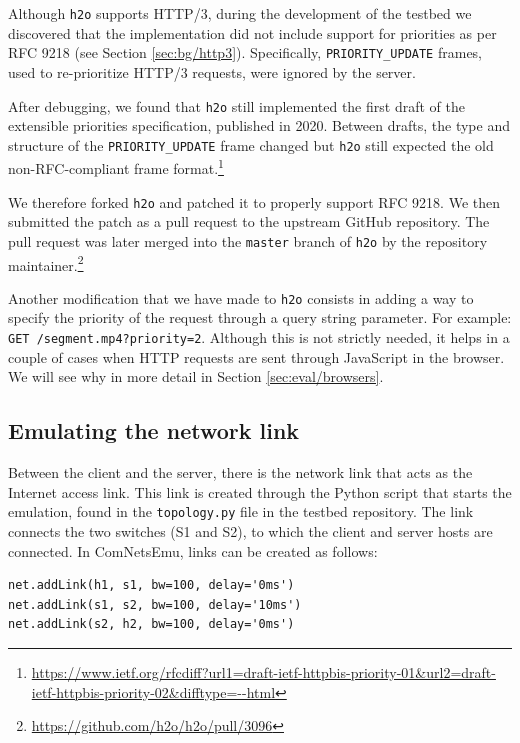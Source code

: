 Although \texttt{h2o} supports HTTP/3, during the development of the testbed we discovered that the implementation did not include support for priorities as per RFC 9218 (see Section \ref{sec:bg/http3}). Specifically, \texttt{PRIORITY\_UPDATE} frames, used to re-prioritize HTTP/3 requests, were ignored by the server.

After debugging, we found that \texttt{h2o} still implemented the first draft of the extensible priorities specification, published in 2020. Between drafts, the type and structure of the \texttt{PRIORITY\_UPDATE} frame changed but \texttt{h2o} still expected the old non-RFC-compliant frame format.\footnote{\url{https://www.ietf.org/rfcdiff?url1=draft-ietf-httpbis-priority-01&url2=draft-ietf-httpbis-priority-02&difftype=--html}}

We therefore forked \texttt{h2o} and patched it to properly support RFC 9218. We then submitted the patch as a pull request to the upstream GitHub repository. The pull request was later merged into the \texttt{master} branch of \texttt{h2o} by the repository maintainer.\footnote{\url{https://github.com/h2o/h2o/pull/3096}}

Another modification that we have made to \texttt{h2o} consists in adding a way to specify the priority of the request through a query string parameter. For example: \texttt{GET /segment.mp4?priority=2}. Although this is not strictly needed, it helps in a couple of cases when HTTP requests are sent through JavaScript in the browser. We will see why in more detail in Section \ref{sec:eval/browsers}.

\subsection{Emulating the network link}
\label{sec:eval/testbed/network}

Between the client and the server, there is the network link that acts as the Internet access link. This link is created through the Python script that starts the emulation, found in the \texttt{topology.py} file in the testbed repository. The link connects the two switches (S1 and S2), to which the client and server hosts are connected. In ComNetsEmu, links can be created as follows:

\begin{verbatim}
net.addLink(h1, s1, bw=100, delay='0ms')
net.addLink(s1, s2, bw=100, delay='10ms')
net.addLink(s2, h2, bw=100, delay='0ms')
\end{verbatim}

